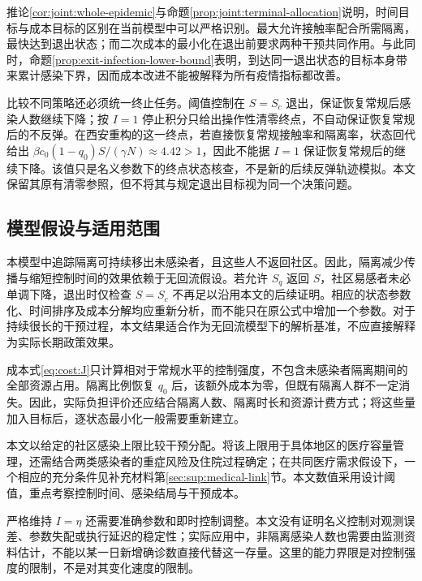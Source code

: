 推论\ref{cor:joint:whole-epidemic}与命题\ref{prop:joint:terminal-allocation}说明，时间目标与成本目标的区别在当前模型中可以严格识别。最大允许接触率配合所需隔离，最快达到退出状态；而二次成本的最小化在退出前要求两种干预共同作用。与此同时，命题\ref{prop:exit-infection-lower-bound}表明，到达同一退出状态的目标本身带来累计感染下界，因而成本改进不能被解释为所有疫情指标都改善。

比较不同策略还必须统一终止任务。阈值控制在 $S=S_c$ 退出，保证恢复常规后感染人数继续下降；按 $I=1$ 停止积分只给出操作性清零终点，不自动保证恢复常规后的不反弹。在西安重构的这一终点，若直接恢复常规接触率和隔离率，状态回代给出 $\beta c_0(1-q_0)S/(\gamma N)\approx4.42>1$，因此不能据 $I=1$ 保证恢复常规后的继续下降。该值只是名义参数下的终点状态核查，不是新的后续反弹轨迹模拟。本文保留其原有清零参照，但不将其与规定退出目标视为同一个决策问题。

\subsection{模型假设与适用范围}
本模型中追踪隔离可持续移出未感染者，且这些人不返回社区。因此，隔离减少传播与缩短控制时间的效果依赖于无回流假设。若允许 $S_q$ 返回 $S$，社区易感者未必单调下降，退出时仅检查 $S=S_c$ 不再足以沿用本文的后续证明。相应的状态参数化、时间排序及成本分解均应重新分析，而不能只在原公式中增加一个参数。对于持续很长的干预过程，本文结果适合作为无回流模型下的解析基准，不应直接解释为实际长期政策效果。

成本式\eqref{eq:cost:J}只计算相对于常规水平的控制强度，不包含未感染者隔离期间的全部资源占用。隔离比例恢复 $q_0$ 后，该额外成本为零，但既有隔离人群不一定消失。因此，实际负担评价还应结合隔离人数、隔离时长和资源计费方式；将这些量加入目标后，逐状态最小化一般需要重新建立。

本文以给定的社区感染上限比较干预分配。将该上限用于具体地区的医疗容量管理，还需结合两类感染者的重症风险及住院过程确定；在共同医疗需求假设下，一个相应的充分条件见补充材料第\ref*{sec:sup:medical-link}节。本文数值采用设计阈值，重点考察控制时间、感染结局与干预成本。

严格维持 $I=\eta$ 还需要准确参数和即时控制调整。本文没有证明名义控制对观测误差、参数失配或执行延迟的稳定性；实际应用中，非隔离感染人数也需要由监测资料估计，不能以某一日新增确诊数直接代替这一存量。这里的能力界限是对控制强度的限制，不是对其变化速度的限制。

